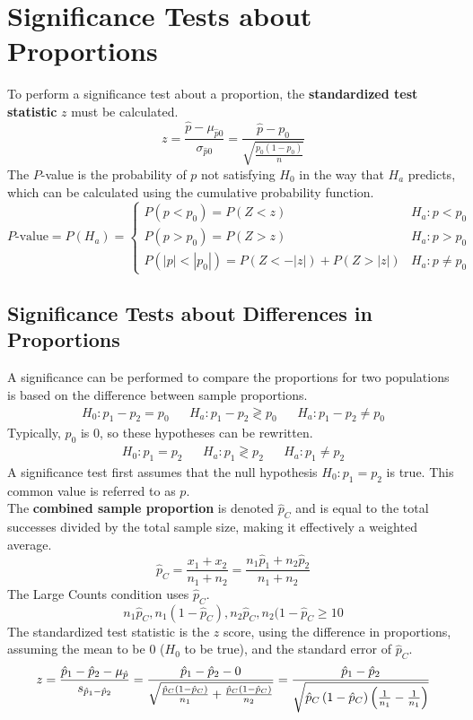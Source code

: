 \documentclass[../AP_Statistics.tex]{subfiles}
\begin{document}
		\section{Significance Tests about Proportions}
			To perform a significance test about a proportion, the \textbf{standardized test statistic} $z$ must be calculated. \\
			$$z = \frac{\hat{p} - \mu_{\hat{p}0}}{\sigma_{\hat{p}0}} = \frac{\hat{p} - p_0}{\sqrt{\frac{p_0(1 - p_0)}{n}}}$$
			The $P$-value is the probability of $p$ not satisfying $H_0$ in the way that $H_a$ predicts, which can be calculated using the cumulative probability function.
			$$
				P\text{-value} = P(H_a) = \begin{cases}
 					P(p < p_0) = P(Z < z) & H_a:p < p_0 \\
 					P(p > p_0) = P(Z > z) & H_a:p > p_0 \\
 					P(|p| < |p_0|) = P(Z < -|z|) + P(Z > |z|) & H_a:p \ne p_0
				\end{cases}
			$$
			\subsection*{Significance Tests about Differences in Proportions}
				A significance can be performed to compare the proportions for two populations is based on the difference between sample proportions.
				\begin{align*}
					H_0:p_1 - p_2 = p_0 && H_a: p_1 - p_2 \gtrless p_0 && H_a:p_1 - p_2 \ne p_0
				\end{align*}
				Typically, $p_0$ is 0, so these hypotheses can be rewritten.
				\begin{align*}
					H_0:p_1 = p_2 && H_a:p_1 \gtrless p_2 && H_a:p_1 \ne p_2
				\end{align*}
				A significance test first assumes that the null hypothesis $H_0:p_1 = p_2$ is true. This common value is referred to as $p$. \\
				The \textbf{combined sample proportion} is denoted $\hat{p}_C$ and is equal to the total successes divided by the total sample size, making it effectively a weighted average.
				$$\hat{p}_C = \frac{x_1 + x_2}{n_1 + n_2} = \frac{n_1\hat{p}_1 + n_2\hat{p}_2}{n_1 + n_2}$$
				The Large Counts condition uses $\hat{p}_C$.
				$$n_1\hat{p}_C, n_1(1 - \hat{p}_C), n_2\hat{p}_C, n_2(1 - \hat{p}_C \ge 10$$
				The standardized test statistic is the $z$ score, using the difference in proportions, assuming the mean to be 0 ($H_0$ to be true), and the standard error of $\hat{p}_C$.
				$$z = \frac{\hat{p}_1 - \hat{p}_2 - \mu_{\hat{p}}}{s_{\hat{p}_1 - \hat{p}_2}} = \frac{\hat{p}_1 - \hat{p}_2 - 0}{\sqrt{\frac{\hat{p}_C\left(1 - \hat{p}_C\right)}{n_1} + \frac{\hat{p}_C\left(1 - \hat{p}_C\right)}{n_2}}} = \frac{\hat{p}_1 - \hat{p}_2}{\sqrt{\hat{p}_C\left(1 - \hat{p}_C\right)\left(\frac{1}{n_1} - \frac{1}{n_1}\right)}}$$
\end{document}
